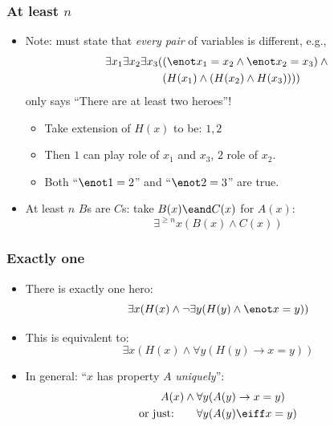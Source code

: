 \begin{frame}
  \frametitle{At least $n$}

\begin{itemize}[<+->]
\item Note: must state that \emph{every pair} of variables is different, e.g.,
\begin{align*}
\exists x_1\exists x_2\exists x_3(&(\enot x_1 = x_2 \land \enot x_2 = x_3) \land {}\\
& (H(x_1) \land (H(x_2) \land H(x_3))))
\end{align*}
only says ``There are at least two heroes''!
\begin{itemize}[<+->]
  \item Take extension of $H(x)$ to be: $1,2$
  \item Then $1$ can play role of $x_1$ and $x_3$, $2$ role of $x_2$.
  \item Both ``$\enot 1=2$'' and ``$\enot 2=3$'' are true.
\end{itemize}
\item At least $n$ $B$s are $C$s: take $B(x) \eand C(x)$ for $A(x)$:
\[
\exists^{\ge n} x(B(x) \land C(x))
\]
\end{itemize}
\end{frame}

\begin{frame}
    \frametitle{Exactly one}

\begin{itemize}[<+->]
\item There is exactly one hero:
\[
\exists x(H(x) \land \lnot \exists y(H(y) \land \enot x = y))
\]
\item This is equivalent to:
\[
\exists x(H(x) \land \forall y(H(y) \to x = y))
\]
\item In general: ``$x$ has property $A$ \emph{uniquely}'':
\begin{align*}
A(x) \land {} & \forall y(A(y) \to x = y)\\
\text{or just:\qquad} & \forall y(A(y) \eiff x = y)
\end{align*}
\end{itemize}
\end{frame}

